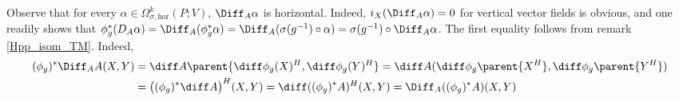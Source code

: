 \begin{obs}
    Observe that for every \(\alpha \in \Omega^k_{\sigma, \mathrm{hor}}(P;V)\), \(\Diff_A\alpha\) is horizontal. Indeed, \(i_X(\Diff_A\alpha)=0\) for vertical vector fields is obvious, and one readily shows that \(\phi_g^*(D_A\alpha)=\Diff_A(\phi_g^*\alpha)=\Diff_A(\sigma(g^{-1})\circ \alpha)=\sigma(g^{-1})\circ \Diff_A\alpha \). The first equality follows from remark \ref{Hpp_isom_TM}. Indeed,
    \begin{align*}
    (\phi_g)^* \Diff_A A(X,Y)&=\diff A\parent{\diff\phi_g(X)^H, \diff\phi_g(Y)^H} = \diff A(\diff\phi_g\parent{X^H}, \diff\phi_g\parent{Y^H})\\
    &=\big((\phi_g)^* \diff A\big)^H(X,Y) =\diff ((\phi_g)^*A)^H(X,Y)=\Diff_A((\phi_g)^*A)(X,Y)
    \end{align*}
\end{obs}



